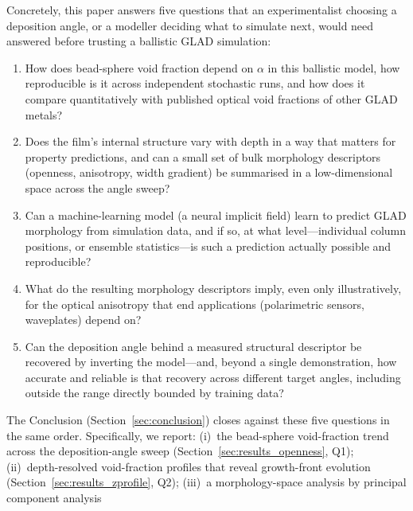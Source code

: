 \documentclass[aip,amsmath,amssymb,reprint]{revtex4-1}
\newcommand{\dang}{\ensuremath{\alpha}}
\begin{document}
Concretely, this paper answers five questions that an experimentalist
choosing a deposition angle, or a modeller deciding what to simulate next,
would need answered before trusting a ballistic GLAD simulation:
\begin{enumerate}
  \item[\textbf{Q1}] How does bead-sphere void fraction depend on $\dang$
    in this ballistic model, how reproducible is it across independent
    stochastic runs, and how does it compare quantitatively with published
    optical void fractions of other GLAD metals?
  \item[\textbf{Q2}] Does the film's internal structure vary with depth in
    a way that matters for property predictions, and can a small set of
    bulk morphology descriptors (openness, anisotropy, width gradient) be
    summarised in a low-dimensional space across the angle sweep?
  \item[\textbf{Q3}] Can a machine-learning model (a neural implicit field)
    learn to predict GLAD morphology from simulation data, and if so, at
    what level---individual column positions, or ensemble statistics---is
    such a prediction actually possible and reproducible?
  \item[\textbf{Q4}] What do the resulting morphology descriptors imply,
    even only illustratively, for the optical anisotropy that end
    applications (polarimetric sensors, waveplates) depend on?
  \item[\textbf{Q5}] Can the deposition angle behind a measured structural
    descriptor be recovered by inverting the model---and, beyond a single
    demonstration, how accurate and reliable is that recovery across
    different target angles, including outside the range directly bounded
    by training data?
\end{enumerate}
The Conclusion (Section~\ref{sec:conclusion}) closes against these five
questions in the same order.
Specifically, we report:
(i)~the bead-sphere void-fraction trend across the deposition-angle sweep
(Section~\ref{sec:results_openness}, Q1);
(ii)~depth-resolved void-fraction profiles that reveal growth-front
evolution (Section~\ref{sec:results_zprofile}, Q2);
(iii)~a morphology-space analysis by principal component analysis
\end{document}
